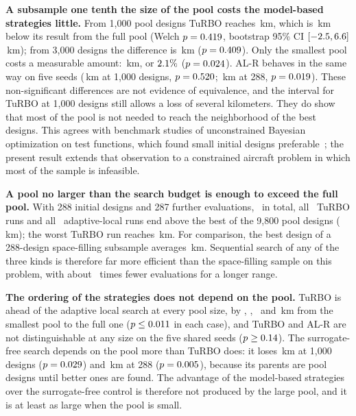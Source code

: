 \textbf{A subsample one tenth the size of the pool costs the model-based strategies little.} From 1{,}000 pool designs TuRBO reaches \NpTurboBMean\,km, which is \NpTurboLossB\,km below its result from the full pool (Welch $p = 0.419$, bootstrap 95\% CI $[-2.5, 6.6]$\,km); from 3{,}000 designs the difference is \NpTurboLossC\,km ($p = 0.409$). Only the smallest pool costs a measurable amount: \NpTurboLossA\,km, or $2.1\%$ ($p = 0.024$). AL-R behaves in the same way on five seeds (\NpALRLossB\,km at 1{,}000 designs, $p = 0.520$; \NpALRLossA\,km at 288, $p = 0.019$). These non-significant differences are not evidence of equivalence, and the interval for TuRBO at 1{,}000 designs still allows a loss of several kilometers. They do show that most of the pool is not needed to reach the neighborhood of the best designs. This agrees with benchmark studies of unconstrained Bayesian optimization on test functions, which found small initial designs preferable~\cite{bossek2020initial,leriche2021revisiting}; the present result extends that observation to a constrained aircraft problem in which most of the sample is infeasible.

\textbf{A pool no larger than the search budget is enough to exceed the full pool.} With 288 initial designs and 287 further evaluations, \NpEvalsA\ in total, all \NpTurboABeatFull\ TuRBO runs and all \NpAdaptABeatFull\ adaptive-local runs end above the best of the 9{,}800 pool designs (\NpFullPoolBest\,km); the worst TuRBO run reaches \NpTurboAMin\,km. For comparison, the best design of a 288-design space-filling subsample averages \NpPoolABest\,km. Sequential search of any of the three kinds is therefore far more efficient than the space-filling sample on this problem, with about \NpEvalRatio\ times fewer evaluations for a longer range.

\textbf{The ordering of the strategies does not depend on the pool.} TuRBO is ahead of the adaptive local search at every pool size, by \NpTvAAD, \NpTvABD, \NpTvACD\ and \NpTvAFD\,km from the smallest pool to the full one ($p \le 0.011$ in each case), and TuRBO and AL-R are not distinguishable at any size on the five shared seeds ($p \ge 0.14$). The surrogate-free search depends on the pool more than TuRBO does: it loses \NpAdaptLossB\,km at 1{,}000 designs ($p = 0.029$) and \NpAdaptLossA\,km at 288 ($p = 0.005$), because its parents are pool designs until better ones are found. The advantage of the model-based strategies over the surrogate-free control is therefore not produced by the large pool, and it is at least as large when the pool is small.

